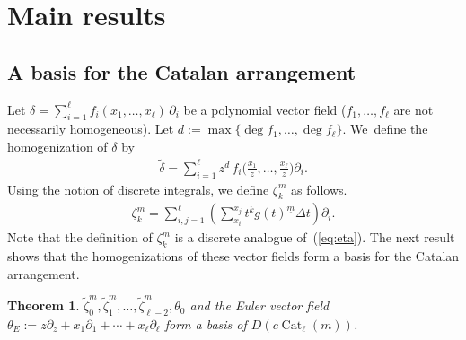 \documentclass[10pt,a4paper]{amsart}
\numberwithin{equation}{section}
\newtheorem{Theorem}{Theorem}[section]
\newcommand{\Cat}{\operatorname{Cat}}
\newcommand{\sint}{\sum\nolimits}
\begin{document}
\section{Main results}\label{sec:main}

\subsection{A basis for the Catalan arrangement}

Let $\delta=\sum_{i=1}^\ell f_i(x_1, \dots, x_\ell)\,\partial_i$ be a polynomial
vector field ($f_1, \dots, f_\ell$ are not necessarily homogeneous).
Let $d:=\max\{\deg f_1, \dots, \deg f_\ell\}$. We~define the homogenization
of $\delta$ by
\begin{gather*}
\widetilde{\delta}=\sum_{i=1}^\ell z^d\, f_i\bigg(\frac{x_1}{z}, \dots, \frac{x_\ell}{z}\bigg)\partial_i.
\end{gather*}
Using the notion of discrete integrals, we define $\zeta_k^m$ as follows.
\begin{gather*}
\zeta_k^m=\sum_{i, j=1}^\ell\left(\sint_{x_i}^{x_j}t^kg(t)^{\underline{m}} \Delta t\right)
\partial_i.
\end{gather*}
Note that the definition of $\zeta_k^m$ is a discrete analogue of~(\ref{eq:eta}).
The next result shows that the homogenizations of these vector fields
form a basis for the Catalan arrangement.

\begin{Theorem}
\label{thm:cat}
$\widetilde{\zeta}_0^m, \widetilde{\zeta}_1^m, \dots, \widetilde{\zeta}_{\ell-2}^m,
\theta_0$ and
the Euler vector field $\theta_E:=z\partial_z+x_1\partial_1+\cdots+x_\ell\partial_\ell$
form a basis of $D(c\Cat_\ell(m))$.
\end{Theorem}
\end{document}
